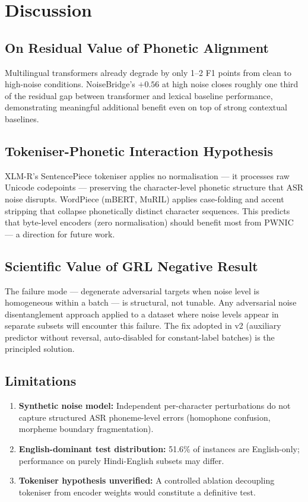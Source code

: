 \documentclass[12pt,a4paper]{report}
\begin{document}
\chapter{Discussion}

\section{On Residual Value of Phonetic Alignment}
Multilingual transformers already degrade by only 1--2 F1 points from clean to high-noise conditions. NoiseBridge's $+0.56$ at high noise closes roughly one third of the residual gap between transformer and lexical baseline performance, demonstrating meaningful additional benefit even on top of strong contextual baselines.

\section{Tokeniser-Phonetic Interaction Hypothesis}
XLM-R's SentencePiece tokeniser applies no normalisation --- it processes raw Unicode codepoints --- preserving the character-level phonetic structure that ASR noise disrupts. WordPiece (mBERT, MuRIL) applies case-folding and accent stripping that collapse phonetically distinct character sequences. This predicts that byte-level encoders (zero normalisation) should benefit most from PWNIC --- a direction for future work.

\section{Scientific Value of GRL Negative Result}
The failure mode --- degenerate adversarial targets when noise level is homogeneous within a batch --- is structural, not tunable. Any adversarial noise disentanglement approach applied to a dataset where noise levels appear in separate subsets will encounter this failure. The fix adopted in v2 (auxiliary predictor without reversal, auto-disabled for constant-label batches) is the principled solution.

\section{Limitations}
\begin{enumerate}[leftmargin=*]
  \item \textbf{Synthetic noise model:} Independent per-character perturbations do not capture structured ASR phoneme-level errors (homophone confusion, morpheme boundary fragmentation).
  \item \textbf{English-dominant test distribution:} 51.6\% of instances are English-only; performance on purely Hindi-English subsets may differ.
  \item \textbf{Tokeniser hypothesis unverified:} A controlled ablation decoupling tokeniser from encoder weights would constitute a definitive test.
\end{enumerate}
\end{document}
